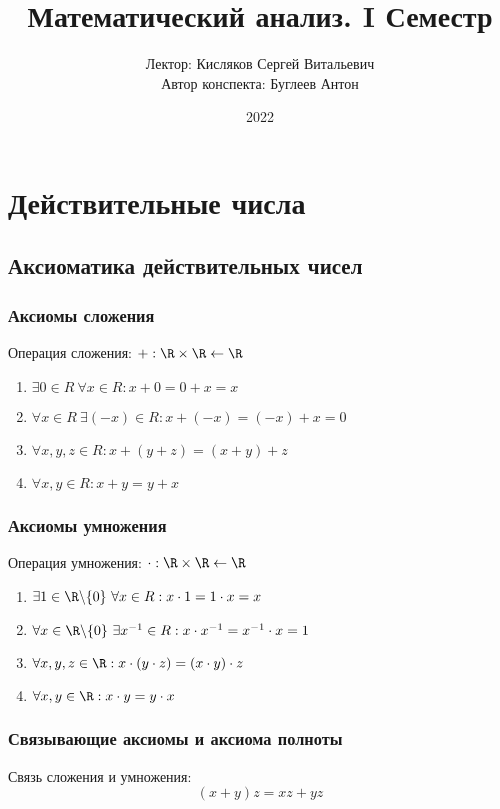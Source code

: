 \documentclass[a4paper, 14pt]{article}
\title{Математический анализ. I Семестр}
\author{Лектор: Кисляков Сергей Витальевич \\
        Автор конспекта: Буглеев Антон}
\date{2022}
\begin{document}
    \maketitle
    \newpage

    \tableofcontents
    \newpage

    \section{Действительные числа}
    \subsection{Аксиоматика действительных чисел}
    \subsubsection*{Аксиомы сложения}

    Операция сложения: $+: \R \times \R \leftarrow \R$

    \begin{enumerate}
        \item $\exists 0 \in R \ \forall x \in R: x + 0 = 0 + x = x$
        \item $\forall x \in R \ \exists (-x) \in R: x + (-x) = (-x) + x = 0$
        \item $\forall x, y, z \in R: x + (y + z) = (x + y) + z$
        \item $\forall x, y \in R: x + y = y + x$
    \end{enumerate}

    \subsubsection*{Аксиомы умножения}
    Операция умножения: $\cdot: \R \times \R \leftarrow \R$

    \begin{enumerate}
        \item $\exists 1 \in \R \backslash \{0\} \ \forall x \in R: x\cdot 1 = 1\cdot x = x$
        \item $\forall x \in \R \backslash \{0\} \ \exists x^{-1} \in R: x \cdot x^{-1} = x^{-1} \cdot x = 1$
        \item $\forall x,y,z \in \R: x \cdot (y \cdot z) = (x \cdot y) \cdot z$
        \item $\forall x,y \in \R: x \cdot y = y \cdot x$
    \end{enumerate}


    \subsubsection*{Связывающие аксиомы и аксиома полноты}
    Связь сложения и умножения: \[(x+y)z = xz + yz\]
\end{document}
